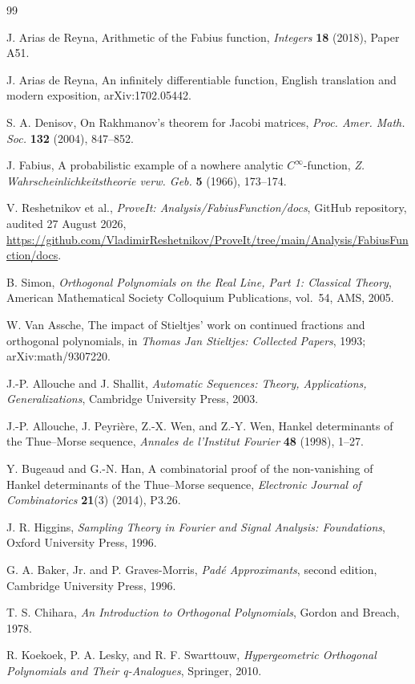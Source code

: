 \documentclass[11pt]{article}
\theoremstyle{definition}
\theoremstyle{remark}
\begin{document}
\begin{thebibliography}{99}

J. Arias de Reyna,
\newblock Arithmetic of the Fabius function,
\newblock \emph{Integers} \textbf{18} (2018), Paper A51.

J. Arias de Reyna,
\newblock An infinitely differentiable function,
\newblock English translation and modern exposition, arXiv:1702.05442.

S. A. Denisov,
\newblock On Rakhmanov's theorem for Jacobi matrices,
\newblock \emph{Proc. Amer. Math. Soc.} \textbf{132} (2004), 847--852.

J. Fabius,
\newblock A probabilistic example of a nowhere analytic \(C^\infty\)-function,
\newblock \emph{Z. Wahrscheinlichkeitstheorie verw. Geb.} \textbf{5} (1966), 173--174.

V. Reshetnikov et al.,
\newblock \emph{ProveIt: Analysis/FabiusFunction/docs},
\newblock GitHub repository, audited 27 August 2026,
\newblock \url{https://github.com/VladimirReshetnikov/ProveIt/tree/main/Analysis/FabiusFunction/docs}.

B. Simon,
\newblock \emph{Orthogonal Polynomials on the Real Line, Part 1: Classical Theory},
\newblock American Mathematical Society Colloquium Publications, vol.~54, AMS, 2005.

W. Van Assche,
\newblock The impact of Stieltjes' work on continued fractions and orthogonal polynomials,
\newblock in \emph{Thomas Jan Stieltjes: Collected Papers}, 1993; arXiv:math/9307220.



J.-P. Allouche and J. Shallit,
\newblock \emph{Automatic Sequences: Theory, Applications, Generalizations},
\newblock Cambridge University Press, 2003.

J.-P. Allouche, J. Peyri\`ere, Z.-X. Wen, and Z.-Y. Wen,
\newblock Hankel determinants of the Thue--Morse sequence,
\newblock \emph{Annales de l'Institut Fourier} \textbf{48} (1998), 1--27.

Y. Bugeaud and G.-N. Han,
\newblock A combinatorial proof of the non-vanishing of Hankel determinants of the
Thue--Morse sequence,
\newblock \emph{Electronic Journal of Combinatorics} \textbf{21}(3) (2014), P3.26.

J. R. Higgins,
\newblock \emph{Sampling Theory in Fourier and Signal Analysis: Foundations},
\newblock Oxford University Press, 1996.

G. A. Baker, Jr. and P. Graves-Morris,
\newblock \emph{Pad\'e Approximants}, second edition,
\newblock Cambridge University Press, 1996.

T. S. Chihara,
\newblock \emph{An Introduction to Orthogonal Polynomials},
\newblock Gordon and Breach, 1978.

R. Koekoek, P. A. Lesky, and R. F. Swarttouw,
\newblock \emph{Hypergeometric Orthogonal Polynomials and Their q-Analogues},
\newblock Springer, 2010.

\end{thebibliography}
\end{document}
